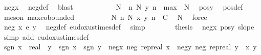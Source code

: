 \begin{isabellebody}
\ neg{\isacharunderscore}{\kern0pt}x\ \isamarkupfalse%
\ neg{\isacharunderscore}{\kern0pt}def\ \isamarkupfalse%
\ blast\isanewline
\ \ \ \ \ \ \ \ \isamarkupfalse%
\ \isamarkupfalse%
\ N{\isacharprime}{\kern0pt}\ \ {\isachardoublequoteopen}{\isasymforall}n{\isasymge}\ N{\isacharprime}{\kern0pt}{\isachardot}{\kern0pt}\ y\ n\ {\isasymge}\ max\ {}\ N{\isachardoublequoteclose}\ \isamarkupfalse%
\ pos{\isacharunderscore}{\kern0pt}y\ \isamarkupfalse%
\ pos{\isacharunderscore}{\kern0pt}def\ \isamarkupfalse%
\ {\isacharparenleft}{\kern0pt}meson\ max{\isachardot}{\kern0pt}cobounded{}{\isacharparenright}{\kern0pt}\isanewline
\ \ \ \ \ \ \ \ \isamarkupfalse%
\ {\isachardoublequoteopen}{\isasymexists}N{\isacharprime}{\kern0pt}{\isachardot}{\kern0pt}\ {\isasymforall}n{\isasymge}\ N{\isacharprime}{\kern0pt}{\isachardot}{\kern0pt}\ x\ {\isacharparenleft}{\kern0pt}y\ n{\isacharparenright}{\kern0pt}\ {\isasymle}\ {\isacharminus}{\kern0pt}C{\isachardoublequoteclose}\ \isamarkupfalse%
\ N\ \isamarkupfalse%
\ force\isanewline
\ \ \ \ \ \ \isacommand{{\isacharbraceright}{\kern0pt}}\isamarkupfalse%
\isanewline
\ \ \ \ \ \ \isamarkupfalse%
\ {\isachardoublequoteopen}neg\ {\isacharparenleft}{\kern0pt}x\ {\isacharasterisk}{\kern0pt}\isactrlsub e\ y{\isacharparenright}{\kern0pt}{\isachardoublequoteclose}\ \isamarkupfalse%
\ neg{\isacharunderscore}{\kern0pt}def\ eudoxus{\isacharunderscore}{\kern0pt}times{\isacharunderscore}{\kern0pt}def\ \isamarkupfalse%
\ simp\isanewline
\ \ \ \ \ \ \isamarkupfalse%
\ {\isacharquery}{\kern0pt}thesis\ \isamarkupfalse%
\ neg{\isacharunderscore}{\kern0pt}x\ pos{\isacharunderscore}{\kern0pt}y\ slope\ \isamarkupfalse%
\ {\isacharparenleft}{\kern0pt}simp\ add{\isacharcolon}{\kern0pt}\ eudoxus{\isacharunderscore}{\kern0pt}times{\isacharunderscore}{\kern0pt}def{\isacharparenright}{\kern0pt}\isanewline
\ \ \ \ \isamarkupfalse%
\isanewline
\ \ \isamarkupfalse%
\isanewline
\ \ \isamarkupfalse%
\ \isamarkupfalse%
\ {\isachardoublequoteopen}sgn\ {\isacharparenleft}{\kern0pt}{\isacharparenleft}{\kern0pt}x\ {\isacharcolon}{\kern0pt}{\isacharcolon}{\kern0pt}\ real{\isacharparenright}{\kern0pt}\ {\isacharasterisk}{\kern0pt}\ y{\isacharparenright}{\kern0pt}\ {\isacharequal}{\kern0pt}\ sgn\ x\ {\isacharasterisk}{\kern0pt}\ sgn\ y{\isachardoublequoteclose}\ \ neg{\isacharunderscore}{\kern0pt}x{\isacharcolon}{\kern0pt}\ {\isachardoublequoteopen}neg\ {\isacharparenleft}{\kern0pt}rep{\isacharunderscore}{\kern0pt}real\ x{\isacharparenright}{\kern0pt}{\isachardoublequoteclose}\ \ neg{\isacharunderscore}{\kern0pt}y{\isacharcolon}{\kern0pt}\ {\isachardoublequoteopen}neg\ {\isacharparenleft}{\kern0pt}rep{\isacharunderscore}{\kern0pt}real\ y{\isacharparenright}{\kern0pt}{\isachardoublequoteclose}\ \ x\ y\isanewline

\end{isabellebody}
